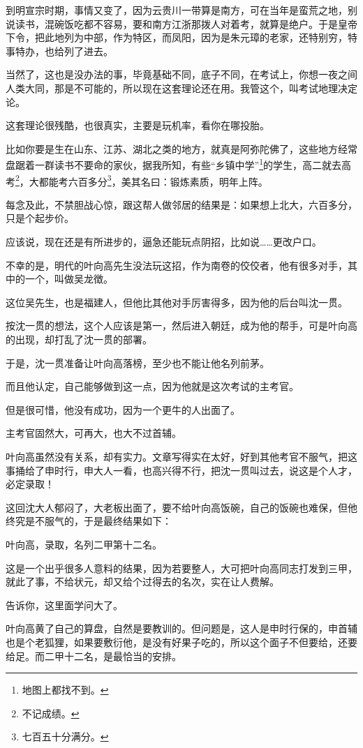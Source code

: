 \begin{multicols}{\theparacolNo}
到明宣宗时期，事情又变了，因为云贵川一带算是南方，可在当年是蛮荒之地，别说读书，混碗饭吃都不容易，要和南方江浙那拨人对着考，就算是绝户。于是皇帝下令，把此地列为中部，作为特区，而凤阳，因为是朱元璋的老家，还特别穷，特事特办，也给列了进去。

当然了，这也是没办法的事，毕竟基础不同，底子不同，在考试上，你想一夜之间人类大同，那是不可能的，所以现在这套理论还在用。我管这个，叫考试地理决定论。

这套理论很残酷，也很真实，主要是玩机率，看你在哪投胎。

比如你要是生在山东、江苏、湖北之类的地方，就真是阿弥陀佛了，这些地方经常盘踞着一群读书不要命的家伙，据我所知，有些“乡镇中学”\footnote{地图上都找不到。}的学生，高二就去高考\footnote{不记成绩。}，大都能考六百多分\footnote{七百五十分满分。}，美其名曰：锻炼素质，明年上阵。

每念及此，不禁胆战心惊，跟这帮人做邻居的结果是：如果想上北大，六百多分，只是个起步价。

应该说，现在还是有所进步的，逼急还能玩点阴招，比如说……更改户口。

不幸的是，明代的叶向高先生没法玩这招，作为南卷的佼佼者，他有很多对手，其中的一个，叫做吴龙徴。

这位吴先生，也是福建人，但他比其他对手厉害得多，因为他的后台叫沈一贯。

按沈一贯的想法，这个人应该是第一，然后进入朝廷，成为他的帮手，可是叶向高的出现，却打乱了沈一贯的部署。

于是，沈一贯准备让叶向高落榜，至少也不能让他名列前茅。

而且他认定，自己能够做到这一点，因为他就是这次考试的主考官。

但是很可惜，他没有成功，因为一个更牛的人出面了。

主考官固然大，可再大，也大不过首辅。

叶向高虽然没有关系，却有实力。文章写得实在太好，好到其他考官不服气，把这事捅给了申时行，申大人一看，也高兴得不行，把沈一贯叫过去，说这是个人才，必定录取！

这回沈大人郁闷了，大老板出面了，要不给叶向高饭碗，自己的饭碗也难保，但他终究是不服气的，于是最终结果如下：

叶向高，录取，名列二甲第十二名。

这是一个出乎很多人意料的结果，因为若要整人，大可把叶向高同志打发到三甲，就此了事，不给状元，却又给个过得去的名次，实在让人费解。

告诉你，这里面学问大了。

叶向高黄了自己的算盘，自然是要教训的。但问题是，这人是申时行保的，申首辅也是个老狐狸，如果要敷衍他，是没有好果子吃的，所以这个面子不但要给，还要给足。而二甲十二名，是最恰当的安排。


\end{multicols}
